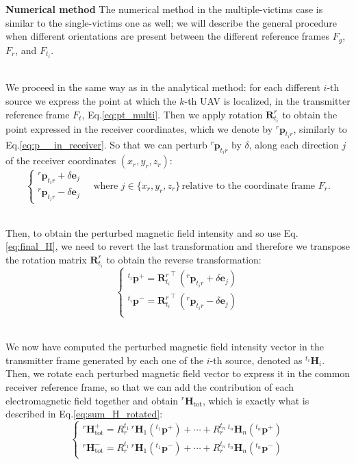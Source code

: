 \documentclass[main]{subfiles}
\begin{document}
\textbf{Numerical method}
The numerical method in the multiple-victims case is similar to the single-victims one as well;
we will describe the general procedure when different orientations
are present between the different reference frames $F_g$, $F_r$, and $F_{t_i}$.

\noindent\\
We proceed in the same way as in the analytical method: for each different $i$-th source we express the 
point at which the $k$-th UAV is localized,
in the transmitter reference frame $F_t$, Eq.\ref{eq:pt_multi}.
Then we apply rotation $\mathbf{R}^r_{t_i}$ to obtain the point expressed 
in the receiver coordinates, which we denote by ${}^r \mathbf{p}_{t_ir}$, similarly to Eq.\ref{eq:p__in_receiver}.
So that we can perturb ${}^r \mathbf{p}_{t_ir}$ by $\delta$, along each direction $j$ of the 
receiver coordinates $(x_r, y_r, z_r)$:
\[
\begin{cases}
    {}^r \mathbf{p}_{t_ir} + \delta \mathbf{e}_j \\
    {}^r \mathbf{p}_{t_ir} - \delta \mathbf{e}_j
\end{cases} 
\quad \text{where } j \in \{ x_r, y_r, z_r \} \, \text{relative to the coordinate frame } F_r.
\]

\noindent\\
Then, to obtain the perturbed magnetic field intensity and so use Eq.\ref{eq:final_H}, we need to 
revert the last transformation and therefore we transpose the rotation matrix $\mathbf{R}^r_{t_i}$ to 
obtain the reverse transformation:
\[
\begin{cases}
    {}^{t_i} \mathbf{p}^+ = {\mathbf{R}^r_{t_i}}^\top \, ({}^r \mathbf{p}_{t_ir} + \delta \mathbf{e}_j) \\
    {}^{t_i} \mathbf{p}^- =  {\mathbf{R}^r_{t_i}}^\top \, ({}^r \mathbf{p}_{t_ir} - \delta \mathbf{e}_j) \\
\end{cases}
\]

\noindent\\
We now have computed the perturbed magnetic field intensity vector in the transmitter frame 
generated by each one of the $i$-th source, denoted as ${}^{t_i} \mathbf{H}_i$.
Then, we rotate each perturbed magnetic field vector to express it in the common receiver
reference frame, so that we can add the contribution of each electromagnetic field
together and obtain ${}^r \mathbf{H}_{\text{tot}}$, which is exactly what is described
in Eq.\ref{eq:sum_H_rotated}:
\[
\begin{cases}
    {}^r \mathbf{H}_{\text{tot}}^+ = 
    R^{t_1}_r \, {}^{r} \mathbf{H}_1({}^{t_1} \mathbf{p}^+)
    + \cdots + R^{t_n}_r \, {}^{t_n} \mathbf{H}_n({}^{t_n} \mathbf{p}^+) \\
    {}^r \mathbf{H}_{\text{tot}}^- = R^{t_1}_r \, {}^{r} \mathbf{H}_1({}^{t_1} \mathbf{p}^-)
    + \cdots + R^{t_n}_r \, {}^{t_n} \mathbf{H}_n({}^{t_n} \mathbf{p}^-)
\end{cases}
\]
\end{document}
